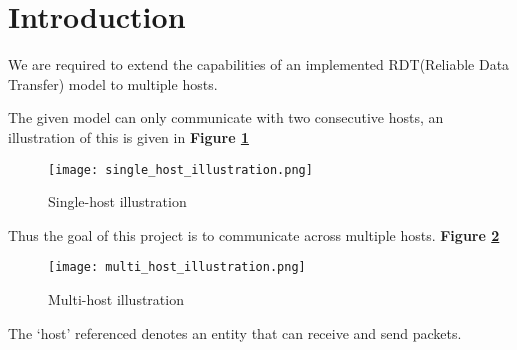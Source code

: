 \section{Introduction}
We are required to extend the capabilities of an implemented RDT(Reliable Data Transfer) model to multiple hosts.

The given model can only communicate with two consecutive hosts, an illustration of this is given in \textbf{Figure \ref{fig:single_host_illustration}}

\begin{figure}[H]\center
 \texttt{[image: single\_host\_illustration.png]}
 \caption{Single-host illustration}
 \label{fig:single_host_illustration}
\end{figure}


Thus the goal of this project is to communicate across multiple hosts. \textbf{Figure \ref{fig:multi_host_illustration}}
\begin{figure}[H]\center
 \texttt{[image: multi\_host\_illustration.png]}
 \caption{Multi-host illustration}
 \label{fig:multi_host_illustration}
\end{figure}


The `host' referenced denotes an entity that can receive and send packets.
